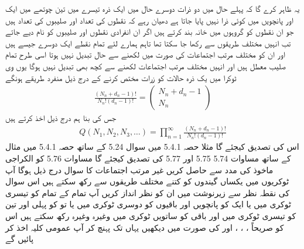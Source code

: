 یہ ظاہر کرے گا کہ پہلے حال میں دو ذرات دوسرے حال میں ایک ذرہ تیسرے میں تین چوتھے میں ایک اور پانچویں میں کوئی ذرا نہیں پایا جاتا ہے دھیان رہے کہ نقطوں کی تعداد  اور صلیبوں کی تعداد  ہیں جو ان نقطوں کو  گروہوں میں خانہ بند کرتے ہیں اگر ان انفرادی نقطوں اور صلیبوں کو نام دیے جاتے تب انہیں  مختلف طریقوں سے رکھا جا سکتا تھا تاہم ہمارے لئے تمام نقطے ایک دوسرے  جیسے ہیں اور ان کو  مختلف مرتب اجتماعات کی صورت میں لکھنے سے حال تبدیل نہیں ہوتا اسی طرح تمام صلیب معطل ہیں اور انہیں  مختلف مرتب اجتماعات لکھنے سے کچھ بھی تبدیل نہیں ہوگا یوں  وی ٹوکرا میں  یک ذرہ حالات کو  زرات مختص کرنے کے درج ذیل منفرد طریقے ہونگے 
\begin{align}
\frac{(N_n + d_n - 1) !}{N_n ! (d_n - 1) !} = 
\begin{pmatrix}
N_n + d_n - 1 \\
N_n
\end{pmatrix}
\end{align}
جس کی بنا ہم درج ذیل اخذ کرتے ہیں 
\begin{align}
Q(N_1 , N_2 , N_3 , \dotsc) = \prod_{n = 1}^{\infty} \frac{(N_n + d_n - 1) !}{N_n ! (d_n - 1) !}
\end{align}
اس کی تصدیق کیجئے گا مثلا حصہ 5.4.1 میں سوال 5.24 کے ساتھ 
حصہ 5.4.1 میں مثال کے ساتھ مساوات 5.74 5.75 اور 5.77 کی تصدیق کیجئے گا 
مساوات 5.76 کو الكراجى ماخوذ کی مدد سے حاصل کریں غیر مرتب اجتماعات کا سوال درج ذیل ہوگا آپ  ٹوکریوں میں  یکساں گیندوں کو کتنے مختلف طریقوں سے رکھ سکتے ہیں اس سوال کی نقطہ نظر سے زیرنوشت میں ان کو نظر انداز کریں آپ تمام کے تمام  کو تیسری ٹوکری میں یا ایک کو پانچویں اور باقیوں کو دوسری ٹوکری میں یا تو کو پہلی اور تین کو تیسری ٹوکری میں اور باقی کو ساتویں ٹوکری میں وغیرہ وغیرہ رکھ سکتے ہیں اس کو صریحاً ،  ،  ،  اور  کی صورت میں دیکھیں یہاں تک پہنچ کر آپ عمومی کلیہ اخذ کر پائیں گے 

